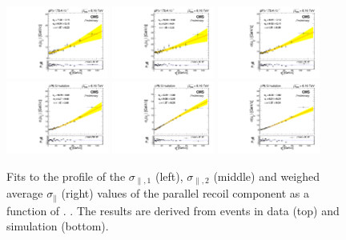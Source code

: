 \begin{figure}[htb!]
 \centering
 \includegraphics[width=0.3\textwidth]{Figures/WBoson/Analysis/Correction/Recoil/RecoilFitsqT/Data/fitPFu1sigma1.pdf}
 \includegraphics[width=0.3\textwidth]{Figures/WBoson/Analysis/Correction/Recoil/RecoilFitsqT/Data/fitPFu1sigma2.pdf}
 \includegraphics[width=0.3\textwidth]{Figures/WBoson/Analysis/Correction/Recoil/RecoilFitsqT/Data/fitPFu1sigma.pdf} \\
 \includegraphics[width=0.3\textwidth]{Figures/WBoson/Analysis/Correction/Recoil/RecoilFitsqT/MC/fitPFu1sigma1.pdf}
 \includegraphics[width=0.3\textwidth]{Figures/WBoson/Analysis/Correction/Recoil/RecoilFitsqT/MC/fitPFu1sigma2.pdf}
 \includegraphics[width=0.3\textwidth]{Figures/WBoson/Analysis/Correction/Recoil/RecoilFitsqT/MC/fitPFu1sigma.pdf}
 \caption{Fits to the profile of the $\sigma_{\parallel,1}$ (left), $\sigma_{\parallel,2}$ (middle) and weighed average $\sigma_{\parallel}$ (right) values of the parallel recoil component as a function of \qtZ. . The results are derived from \ZToMuMu events in data (top) and simulation (bottom).}
 \label{fig:figU1RecoilResolutionFit}
\end{figure}

